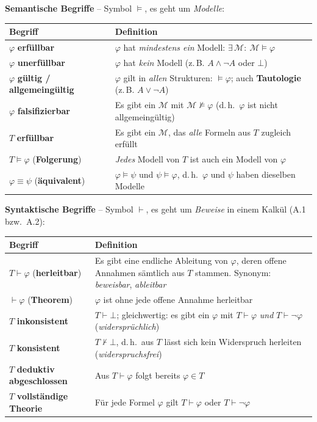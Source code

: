\medskip
\noindent\textbf{Semantische Begriffe} -- Symbol $\models$, es geht um \emph{Modelle}:

\begin{center}
\renewcommand{\arraystretch}{1.5}
\begin{tabularx}{\textwidth}{l X}
\textbf{Begriff} & \textbf{Definition} \\
\hline
$\varphi$ \textbf{erfüllbar} & $\varphi$ hat \emph{mindestens ein} Modell: $\exists\,\mathcal{M}:\ \mathcal{M}\models\varphi$ \\
$\varphi$ \textbf{unerfüllbar} & $\varphi$ hat \emph{kein} Modell (z.\,B. $A\wedge\neg A$ oder $\bot$) \\
$\varphi$ \textbf{gültig / allgemeingültig} & $\varphi$ gilt in \emph{allen} Strukturen: $\models\varphi$; auch \textbf{Tautologie} (z.\,B. $A\vee\neg A$) \\
$\varphi$ \textbf{falsifizierbar} & Es gibt ein $\mathcal{M}$ mit $\mathcal{M}\not\models\varphi$ (d.\,h.\ $\varphi$ ist nicht allgemeingültig) \\
$T$ \textbf{erfüllbar} & Es gibt ein $\mathcal{M}$, das \emph{alle} Formeln aus $T$ zugleich erfüllt \\
$T\models\varphi$ \quad(\textbf{Folgerung}) & \emph{Jedes} Modell von $T$ ist auch ein Modell von $\varphi$ \\
$\varphi\equiv\psi$ \quad(\textbf{äquivalent}) & $\varphi\models\psi$ und $\psi\models\varphi$, d.\,h.\ $\varphi$ und $\psi$ haben dieselben Modelle \\
\end{tabularx}
\end{center}

\medskip
\noindent\textbf{Syntaktische Begriffe} -- Symbol $\vdash$, es geht um \emph{Beweise} in einem Kalkül (A.1 bzw.\ A.2):

\begin{center}
\renewcommand{\arraystretch}{1.5}
\begin{tabularx}{\textwidth}{l X}
\textbf{Begriff} & \textbf{Definition} \\
\hline
$T\vdash\varphi$ \quad(\textbf{herleitbar}) & Es gibt eine endliche Ableitung von $\varphi$, deren offene Annahmen sämtlich aus $T$ stammen. Synonym: \emph{beweisbar}, \emph{ableitbar} \\
$\vdash\varphi$ \quad(\textbf{Theorem}) & $\varphi$ ist ohne jede offene Annahme herleitbar \\
$T$ \textbf{inkonsistent} & $T\vdash\bot$; gleichwertig: es gibt ein $\varphi$ mit $T\vdash\varphi$ \emph{und} $T\vdash\neg\varphi$ (\emph{widersprüchlich}) \\
$T$ \textbf{konsistent} & $T\nvdash\bot$, d.\,h.\ aus $T$ lässt sich kein Widerspruch herleiten (\emph{widerspruchsfrei}) \\
$T$ \textbf{deduktiv abgeschlossen} & Aus $T\vdash\varphi$ folgt bereits $\varphi\in T$ \\
$T$ \textbf{vollständige Theorie} & Für jede Formel $\varphi$ gilt $T\vdash\varphi$ oder $T\vdash\neg\varphi$ \\
\end{tabularx}
\end{center}

